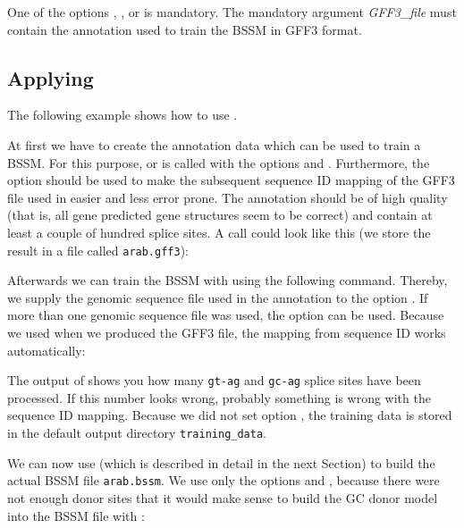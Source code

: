 \documentclass[11pt,a4paper,titlepage]{article}
\begin{document}
One of the options , , or
 is mandatory.
The mandatory argument \textit{GFF3\_file} must contain the annotation used to
train the BSSM in GFF3 format.

\subsection{Applying \Callgthbssmtrain}

The following example shows how to use \Callgthbssmtrain.

At first we have to create the annotation data which can be used to train a
BSSM. For this purpose, \Callgth or \Callgthconsensus is called with the options
 and . Furthermore, the option
 should be used to make the subsequent sequence ID mapping of
the GFF3 file used in \Callgthbssmtrain easier and less error prone.
The annotation should be of high quality (that is, all gene predicted gene
structures seem to be correct) and contain at least a couple of hundred splice
sites. A \Callgth call could look like this (we store the result in a file
called \texttt{arab.gff3}):


Afterwards we can train the BSSM with \Callgthbssmtrain using the following
command. Thereby, we supply the genomic sequence file used in the annotation to
the option . If more than one genomic sequence file was
used, the option  can be used. Because we used
 when we produced the GFF3 file, the mapping from sequence ID
works automatically:


The output of \Callgthbssmtrain shows you how many \texttt{gt-ag} and
\texttt{gc-ag} splice sites have been processed. If this number looks wrong,
probably something is wrong with the sequence ID mapping. Because we did not set
option , the training data is stored in the default output
directory \texttt{training\_data}.

We can now use \Callgthbssmbuild (which is described in detail in the next
Section) to build the actual BSSM file \texttt{arab.bssm}.
We use only the options  and ,
because there were not enough donor sites that it would make sense
to build the GC donor model into the BSSM file with :
\end{document}
